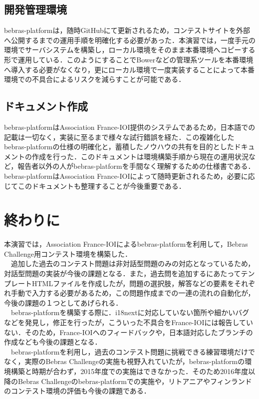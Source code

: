 \documentclass[a4paper]{jarticle}
\begin{document}
\begin{multicols}{2}
\subsection{開発管理環境}
bebras-platformは，随時GitHubにて更新されるため，コンテストサイトを外部へ公開するまでの運用手順を明確化する必要があった．本演習では，一度手元の環境でサーバシステムを構築し，ローカル環境をそのまま本番環境へコピーする形で運用している．このようにすることでBowerなどの管理系ツールを本番環境へ導入する必要がなくなり，更にローカル環境で一度実装することによって本番環境での不具合によるリスクを減らすことが可能である．

\subsection{ドキュメント作成}
bebras-platformはAssociation France-IOI提供のシステムであるため，日本語での記載は一切なく，実装に至るまで様々な試行錯誤を経た．この複雑化したbebras-platformの仕様の明確化と，蓄積したノウハウの共有を目的としたドキュメントの作成を行った．このドキュメントは環境構築手順から現在の運用状況など，報告者以外の人がbebras-platformを手間なく理解するための仕様書である．bebras-platformはAssociation France-IOIによって随時更新されるため，必要に応じてこのドキュメントも整理することが今後重要である．

\section{終わりに}
本演習では，Association France-IOIによるbebras-platformを利用して，Bebras Challenge用コンテスト環境を構築した．
\\　追加した過去のコンテスト問題は非対話型問題のみの対応となっているため，対話型問題の実装が今後の課題となる．また，過去問を追加するにあたってテンプレートHTMLファイルを作成したが，問題の選択肢，解答などの要素をそれぞれ手動で入力する必要があるため，この問題作成までの一連の流れの自動化が，今後の課題の１つとしてあげられる．
\\　bebras-platformを構築する際に．i18nextに対応していない箇所や細かいバグなどを発見し，修正を行ったが，こういった不具合をFrance-IOIには報告していない．そのため，France-IOIへのフィードバックや，日本語対応したブランチの作成なども今後の課題となる．
\\　bebras-platformを利用し，過去のコンテスト問題に挑戦できる練習環境だけでなく，実際のBebras Challengeの実施も視野入れていたが，bebras-platformの環境構築と時期が合わず，2015年度での実施はできなかった．そのため2016年度以降のBebras Challengeのbebras-platformでの実施や，リトアニアやフィンランドのコンテスト環境の評価も今後の課題である．

\end{multicols}
\end{document}
